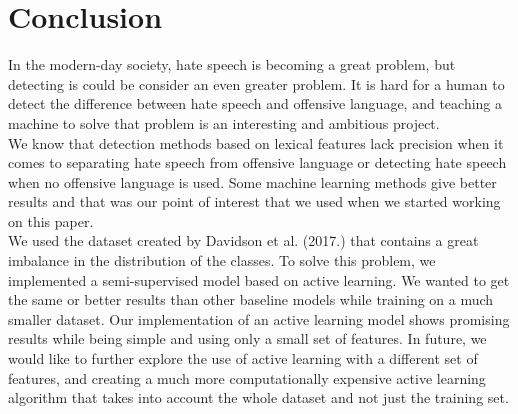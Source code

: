 \documentclass[10pt, a4paper]{article}
\begin{document}
\section{Conclusion}
In the modern-day society, hate speech is becoming a great problem, but detecting is could be consider an even greater problem. It is hard for a human to detect the difference between hate speech and offensive language, and teaching a machine to solve that problem is an interesting and ambitious project.
\\We know that detection methods based on lexical features lack precision when it comes to separating hate speech from offensive language or detecting hate speech when no offensive language is used. Some machine learning methods give better results and that was our point of interest that we used when we started working on this paper.
\\We used the dataset created by Davidson et al. (2017.) that contains a great imbalance in the distribution of the classes. To solve this problem, we implemented a semi-supervised model based on active learning. We wanted to get the same or better results than other baseline models while training on a much smaller dataset. Our implementation of an active learning model shows promising results while being simple and using only a small set of features. In future, we would like to further explore the use of active learning with a different set of features, and creating a much more computationally expensive active learning algorithm that takes into account the whole dataset and not just the training set.


 
\end{document}
